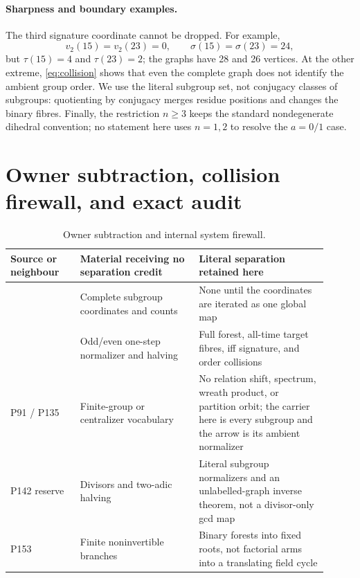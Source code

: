 \documentclass[10pt,a4paper]{amsart}
\theoremstyle{remark}
\begin{document}
\paragraph{Sharpness and boundary examples.}
The third signature coordinate cannot be dropped.  For example,
\[
v_2(15)=v_2(23)=0,\qquad \sigma(15)=\sigma(23)=24,
\]
but \(\tau(15)=4\) and \(\tau(23)=2\); the graphs have 28 and 26 vertices.
At the other extreme, \eqref{eq:collision} shows that even the complete graph
does not identify the ambient group order.  We use the literal subgroup set,
not conjugacy classes of subgroups: quotienting by conjugacy merges residue
positions and changes the binary fibres.  Finally, the restriction \(n\geq3\)
keeps the standard nondegenerate dihedral convention; no statement here
uses \(n=1,2\) to resolve the \(a=0/1\) case.

\section{Owner subtraction, collision firewall, and exact audit}

\begin{table}[H]
\centering
\caption{Owner subtraction and internal system firewall.}
\label{tab:firewall}
\small
\begin{tabular}{L{0.20\linewidth}L{0.34\linewidth}L{0.37\linewidth}}
\toprule
Source or neighbour & Material receiving no separation credit
& Literal separation retained here\\
\midrule
\citet{Cavior1975,ConradDihedralII}
& Complete subgroup coordinates and counts
& None until the coordinates are iterated as one global map\\
\citet{Frenkel2003,ShelashEtAl2023}
& Odd/even one-step normalizer and halving
& Full forest, all-time target fibres, iff signature, and order collisions\\
P91 / P135
& Finite-group or centralizer vocabulary
& No relation shift, spectrum, wreath product, or partition orbit; the
carrier here is every subgroup and the arrow is its ambient normalizer\\
P142 reserve
& Divisors and two-adic halving
& Literal subgroup normalizers and an unlabelled-graph inverse theorem, not a
divisor-only gcd map\\
P153
& Finite noninvertible branches
& Binary forests into fixed roots, not factorial arms into a translating
field cycle\\
\bottomrule
\end{tabular}
\end{table}
\end{document}

